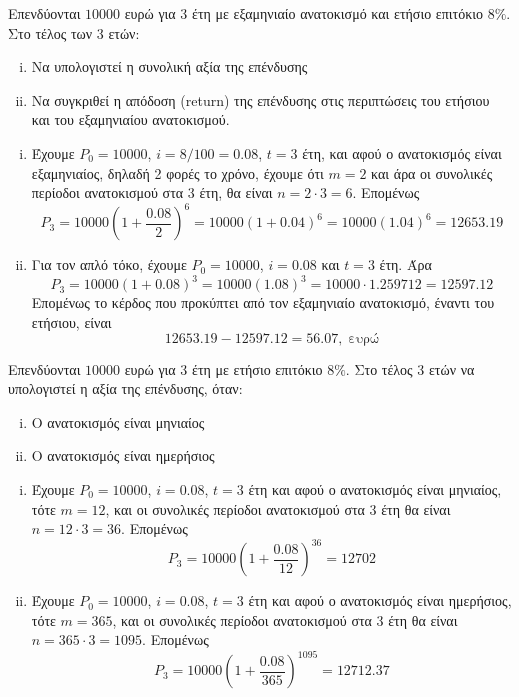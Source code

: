 \begin{example}
  Επενδύονται $ 10000 $ ευρώ για 3 έτη με εξαμηνιαίο ανατοκισμό και ετήσιο επιτόκιο 
  $ 8\% $. Στο τέλος των 3 ετών:
  \begin{enumerate}[i)]
    \item Να υπολογιστεί η συνολική αξία της επένδυσης
    \item Να συγκριθεί η απόδοση (return) της επένδυσης στις περιπτώσεις του ετήσιου και
      του εξαμηνιαίου ανατοκισμού.
  \end{enumerate}
\end{example}
\begin{solution}
\item {}
  \begin{enumerate}[i)]
    \item Έχουμε $ P_{0} = 10000 $, $ i = {8}/{100} = 0.08 $, $ t=3 $ έτη, 
      και αφού ο ανατοκισμός είναι εξαμηνιαίος, δηλαδή 2 φορές το χρόνο, έχουμε ότι 
      $m=2 $ και άρα οι συνολικές περίοδοι ανατοκισμού στα 3 έτη, θα είναι $n=2\cdot 3 =
      6$. Επομένως
      \[
        P_{3} = 10000\left(1+ \frac{0.08}{2} \right)^{6} = 
        10000(1+0.04)^{6} = 10000 (1.04)^{6} = 12653.19
      \] 
    \item Για τον απλό τόκο, έχουμε $ P_{0}=10000 $, $ i=0.08 $ και $ t=3 $ έτη. Άρα
      \[
        P_{3} = 10000(1+0.08)^{3} = 10000(1.08)^{3} = 10000\cdot 1.259712 = 12597.12 
      \] 
      Επομένως το κέρδος που προκύπτει από τον εξαμηνιαίο ανατοκισμό, έναντι του 
      ετήσιου, είναι
      \[
        12653.19-12597.12 = 56.07, \; \text{ευρώ}
      \] 
  \end{enumerate}
\end{solution}

\begin{example}
  Επενδύονται $10000$ ευρώ για 3 έτη με ετήσιο επιτόκιο $ 8\% $. Στο τέλος 3 ετών 
  να υπολογιστεί η αξία της επένδυσης, όταν:
  \begin{enumerate}[i)]
    \item Ο ανατοκισμός είναι μηνιαίος
    \item Ο ανατοκισμός είναι ημερήσιος
  \end{enumerate}
\end{example}
\begin{solution}
\item {}
  \begin{enumerate}[i)]
    \item Έχουμε $ P_{0} = 10000 $, $ i=0.08 $, $ t=3 $ έτη και αφού ο ανατοκισμός 
      είναι μηνιαίος, τότε $ m=12 $, και οι συνολικές περίοδοι ανατοκισμού στα 3 έτη 
      θα είναι $ n=12\cdot 3 = 36 $. Επομένως
      \[
        P_{3} = 10000\left(1+ \frac{0.08}{12} \right)^{36} = 12702 
      \] 
    \item Έχουμε $ P_{0} = 10000 $, $ i=0.08 $, $ t=3 $ έτη και αφού ο ανατοκισμός 
      είναι ημερήσιος, τότε $ m=365 $, και οι συνολικές περίοδοι ανατοκισμού στα 3 έτη 
      θα είναι $ n=365\cdot 3 = 1095 $. Επομένως
      \[
        P_{3} = 10000\left(1+ \frac{0.08}{365} \right)^{1095} = 12712.37 
      \] 
  \end{enumerate}
\end{solution}



